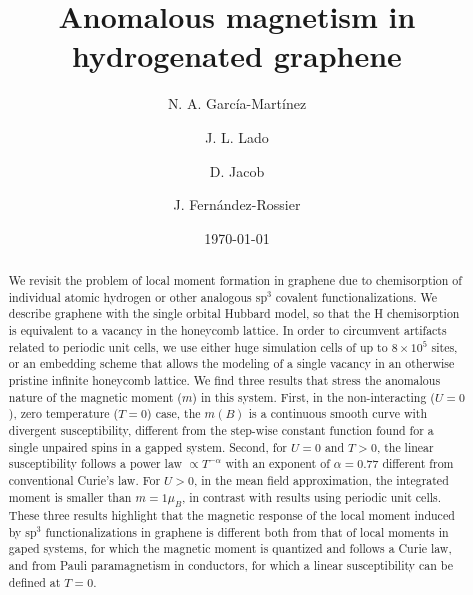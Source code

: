 \documentclass[aps,prb,twocolumn,superscriptaddress]{revtex4-1}
\begin{document}
\title{Anomalous magnetism in hydrogenated graphene}
\author{N. A. Garc\'ia-Mart\'inez}

\author{J. L. Lado}

\author{D. Jacob}

\author{J. Fern\'andez-Rossier}



\date{\today}

\begin{abstract}
We revisit the problem of local moment formation in graphene due to chemisorption of individual atomic hydrogen or other analogous sp$^3$ covalent functionalizations.
We describe graphene with the single orbital Hubbard model, so that the H chemisorption is equivalent to a vacancy in the honeycomb lattice. In order to circumvent artifacts related to periodic unit cells, we use either huge simulation cells of up to $8\times10^5$ sites, or an  embedding scheme that allows the modeling of a single vacancy in an otherwise pristine infinite honeycomb lattice. We find three results that stress the anomalous nature of the magnetic moment ($m$) in this system. First,  in the non-interacting ($U=0$), zero temperature ($T=0$) case, the $m(B)$ is a continuous smooth curve with divergent susceptibility, different from  the step-wise constant function found for a single unpaired spins in a gapped system. Second, for $U=0$ and $T>0$, the linear susceptibility  follows a power law $\propto{T}^{-\alpha}$ with an exponent of $\alpha=0.77$ different from conventional Curie's law. For $U>0$, in the mean field approximation, the integrated moment is smaller than $m=1\mu_B$, in contrast with results using periodic unit cells.
These three results highlight that the magnetic response of  the local moment  induced by sp$^3$ functionalizations in graphene is different both from  that of local moments in gaped systems, for which the magnetic moment is quantized and  follows a Curie law,  and from Pauli paramagnetism in  conductors, for which a linear susceptibility can be defined at $T=0$.
\end{abstract}
\end{document}
